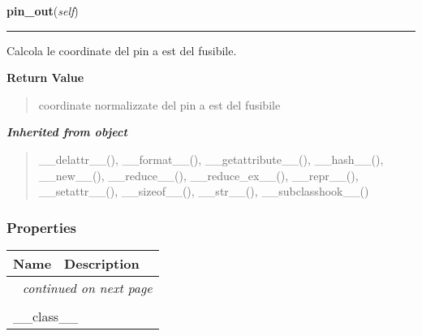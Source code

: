     \label{component:Fuse:pin_out}

    \vspace{0.5ex}

\hspace{.8\funcindent}\begin{boxedminipage}{\funcwidth}

    \raggedright \textbf{pin\_out}(\textit{self})

    \vspace{-1.5ex}

    \rule{\textwidth}{0.5\fboxrule}
\setlength{\parskip}{2ex}
    Calcola le coordinate del pin a est del fusibile.

\setlength{\parskip}{1ex}
      \textbf{Return Value}
    \vspace{-1ex}

      \begin{quote}
      coordinate normalizzate del pin a est del fusibile

      \end{quote}

    \end{boxedminipage}


\large{\textbf{\textit{Inherited from object}}}

\begin{quote}
\_\_delattr\_\_(), \_\_format\_\_(), \_\_getattribute\_\_(), \_\_hash\_\_(), \_\_new\_\_(), \_\_reduce\_\_(), \_\_reduce\_ex\_\_(), \_\_repr\_\_(), \_\_setattr\_\_(), \_\_sizeof\_\_(), \_\_str\_\_(), \_\_subclasshook\_\_()
\end{quote}


  \subsubsection{Properties}

    \vspace{-1cm}
\hspace{\varindent}\begin{longtable}{|p{\varnamewidth}|p{\vardescrwidth}|l}
\cline{1-2}
\cline{1-2} \centering \textbf{Name} & \centering \textbf{Description}& \\
\cline{1-2}
\endhead\cline{1-2}\multicolumn{3}{r}{\small\textit{continued on next page}}\\\endfoot\cline{1-2}
\endlastfoot\multicolumn{2}{|l|}{\textit{Inherited from object}}\\
\multicolumn{2}{|p{\varwidth}|}{\raggedright \_\_class\_\_}\\
\cline{1-2}
\end{longtable}


